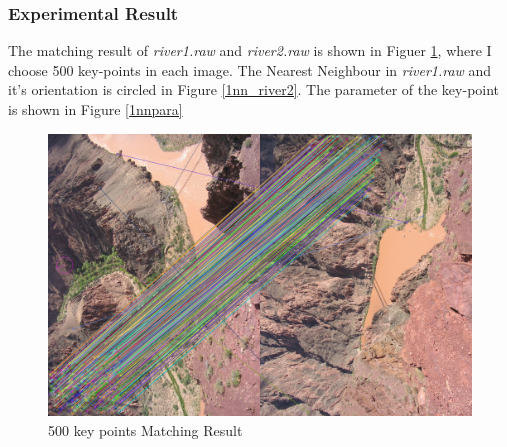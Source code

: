 \documentclass[11pt]{article}
\begin{document}
\subsubsection{Experimental Result}
The matching result of {\it river1.raw} and {\it river2.raw} is shown in Figuer \ref{matching_river}, where I choose 500 key-points in each image. The Nearest Neighbour in {\it river1.raw} and it's orientation is circled in Figure \ref{1nn_river2}. The parameter of the key-point is shown in Figure \ref{1nnpara}

\begin{figure}[!htp]
	\centering
	\includegraphics[scale=0.2]{matching_river.png}
	\caption{ 500 key points Matching Result}
	\label{matching_river}
	\end{figure}
\end{document}
